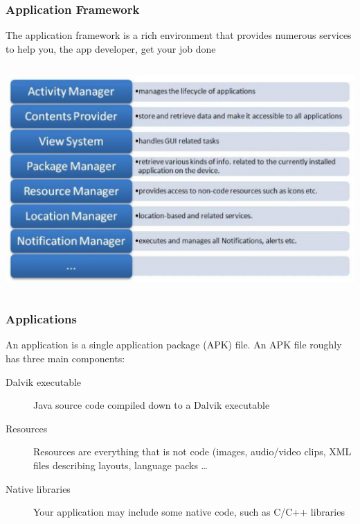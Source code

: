 \begin{frame}
\frametitle{Application Framework}
The \alert{application framework} is a rich environment that provides numerous services to
help you, the app developer, get your job done
\begin{columns}
\centering
\includegraphics[width= 1.0 \textwidth]{fig-2001.eps}
\end{columns}
\end{frame}
\begin{frame}
\frametitle{Applications}
An \alert{application} is a single application package (APK) file. An APK file roughly has three
main components:
\begin{description}
	\item[Dalvik executable] Java source code compiled down to a Dalvik executable
	\item[Resources] Resources are everything that is not code (images, audio/video clips, XML files describing layouts, language packs \dots
	\item[Native libraries] Your application may include some native code, such as C/C++ libraries
\end{description}
\end{frame}
